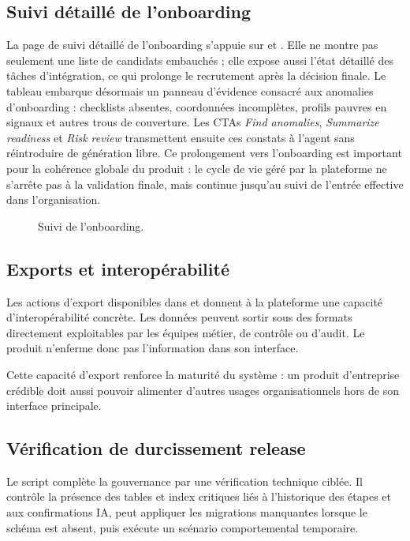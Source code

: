 \subsection{Suivi détaillé de l'onboarding}
La page de suivi détaillé de l'onboarding s'appuie sur  et . Elle ne montre pas seulement une liste de candidats embauchés ; elle expose aussi l'état détaillé des tâches d'intégration, ce qui prolonge le recrutement après la décision finale.
Le tableau embarque désormais un panneau d'évidence consacré aux anomalies d'onboarding : checklists absentes, coordonnées incomplètes, profils pauvres en signaux et autres trous de couverture. Les CTAs \textit{Find anomalies}, \textit{Summarize readiness} et \textit{Risk review} transmettent ensuite ces constats à l'agent sans réintroduire de génération libre.
Ce prolongement vers l'onboarding est important pour la cohérence globale du produit : le cycle de vie géré par la plateforme ne s'arrête pas à la validation finale, mais continue jusqu'au suivi de l'entrée effective dans l'organisation.

\begin{figure}[H]
  \centering
  \caption{Suivi de l'onboarding.}
\end{figure}

\subsection{Exports et interopérabilité}
Les actions d'export disponibles dans  et  donnent à la plateforme une capacité d'interopérabilité concrète. Les données peuvent sortir sous des formats directement exploitables par les équipes métier, de contrôle ou d'audit. Le produit n'enferme donc pas l'information dans son interface.

Cette capacité d'export renforce la maturité du système : un produit d'entreprise crédible doit aussi pouvoir alimenter d'autres usages organisationnels hors de son interface principale.

\subsection{Vérification de durcissement release}
Le script  complète la gouvernance par une vérification technique ciblée. Il contrôle la présence des tables et index critiques liés à l'historique des étapes et aux confirmations IA, peut appliquer les migrations manquantes lorsque le schéma est absent, puis exécute un scénario comportemental temporaire.

